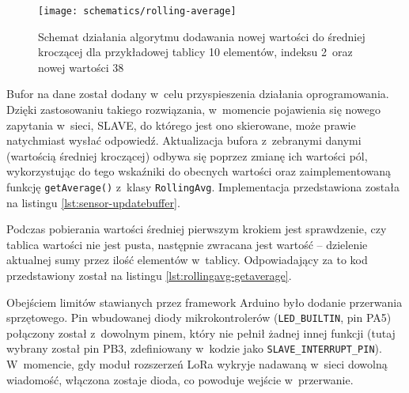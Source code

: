 

\begin{figure}[!htbp]
    \centering
    \texttt{[image: schematics/rolling-average]}
    \caption{\label{img:rolling-average}Schemat działania algorytmu dodawania nowej wartości do średniej kroczącej dla
        przykładowej tablicy 10 elementów, indeksu 2~oraz nowej wartości 38}
\end{figure}



Bufor na dane został dodany w~celu przyspieszenia działania oprogramowania. Dzięki zastosowaniu takiego rozwiązania,
w~momencie pojawienia się nowego zapytania w~sieci, SLAVE, do którego jest ono skierowane, może prawie natychmiast
wysłać odpowiedź. Aktualizacja bufora z~zebranymi danymi (wartością średniej kroczącej) odbywa się poprzez zmianę ich
wartości pól, wykorzystując do tego wskaźniki do obecnych wartości oraz zaimplementowaną funkcję \texttt{getAverage()}
z~klasy \texttt{RollingAvg}. Implementacja przedstawiona została na listingu \ref{lst:sensor-updatebuffer}.



Podczas pobierania wartości średniej pierwszym krokiem jest sprawdzenie, czy tablica wartości nie jest pusta, następnie
zwracana jest wartość -- dzielenie aktualnej sumy przez ilość elementów w~tablicy. Odpowiadający za to kod przedstawiony
został na listingu \ref{lst:rollingavg-getaverage}.



\FloatBarrier
Obejściem limitów stawianych przez framework Arduino było dodanie przerwania sprzętowego. Pin wbudowanej
diody mikrokontrolerów (\texttt{LED\_BUILTIN}, pin PA5) połączony został z~dowolnym pinem, który nie pełnił żadnej innej
funkcji (tutaj wybrany został pin PB3, zdefiniowany w~kodzie jako \texttt{SLAVE\_INTERRUPT\_PIN}). W~momencie, gdy moduł
rozszerzeń LoRa wykryje nadawaną w~sieci dowolną wiadomość, włączona zostaje dioda, co powoduje wejście w~przerwanie.

